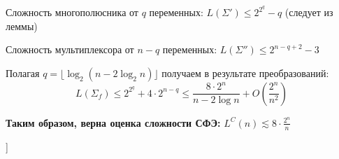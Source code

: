 Сложность многополюсника от $q$ переменных: $L(\Sigma') \leqslant 2^{2^q} - q $ (следует из леммы)

Сложность мультиплексора от $n-q$ переменных: $L(\Sigma'') \leqslant 2^{n - q + 2} - 3$

Полагая $q = \lfloor \log_2(n - 2\log_2 n) \rfloor$ получаем в результате преобразований: 
$$ L(\Sigma_f) \leqslant 2^{2^q} + 4\cdot 2^{n - q} \leqslant \frac{8 \cdot 2^n}{n - 2\log n} + O(\frac{2^n}{n^2}) $$

\textbf{Таким образом, верна оценка сложности СФЭ: }$L^C(n) \lesssim 8 \cdot \frac{2^n}{n}$

\bigbreak
[\cite[page 69-96]{replace_me}]